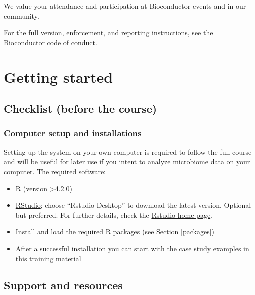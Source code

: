 \documentclass[
  oneside]{book}
\begin{document}
We value your attendance and participation at Bioconductor events and in our community.

For the full version, enforcement, and reporting instructions, see the \href{https://bioconductor.github.io/bioc_coc_multilingual/}{Bioconductor code of conduct}.

\hypertarget{start}{%
\chapter{Getting started}\label{start}}

\hypertarget{checklist-before-the-course}{%
\section{Checklist (before the course)}\label{checklist-before-the-course}}

\hypertarget{computer-setup-and-installations}{%
\subsection{Computer setup and installations}\label{computer-setup-and-installations}}

Setting up the system on your own computer is required to follow the full course and will be useful for later use if you intent to analyze microbiome data on your computer. The required software:

\begin{itemize}
\item
  \href{https://www.r-project.org/}{R (version \textgreater4.2.0)}
\item
  \href{https://www.rstudio.com/products/rstudio/download/}{RStudio};
  choose ``Rstudio Desktop'' to download the latest version. Optional
  but preferred. For further details, check the \href{https://www.rstudio.com/}{Rstudio home
  page}.
\item
  Install and load the required R packages (see Section \ref{packages})
\item
  After a successful installation you can start with the
  case study examples in this training material
\end{itemize}

\hypertarget{support-and-resources}{%
\section{Support and resources}\label{support-and-resources}}
\end{document}
